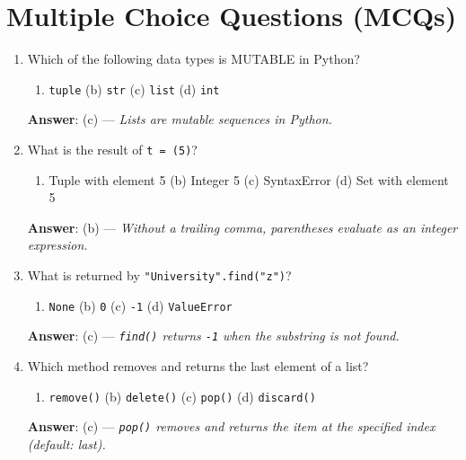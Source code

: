 \section{Multiple Choice Questions (MCQs)}

\begin{enumerate}[leftmargin=1.5em]
    \item Which of the following data types is MUTABLE in Python?
    \begin{enumerate}[label=(\alph*)]
        \item \texttt{tuple} \quad (b) \texttt{str} \quad (c) \texttt{list} \quad (d) \texttt{int}
    \end{enumerate}
    \textbf{Answer}: (c) --- \textit{Lists are mutable sequences in Python.}

    \item What is the result of \texttt{t = (5)}?
    \begin{enumerate}[label=(\alph*)]
        \item Tuple with element 5 \quad (b) Integer 5 \quad (c) SyntaxError \quad (d) Set with element 5
    \end{enumerate}
    \textbf{Answer}: (b) --- \textit{Without a trailing comma, parentheses evaluate as an integer expression.}

    \item What is returned by \texttt{"University".find("z")}?
    \begin{enumerate}[label=(\alph*)]
        \item \texttt{None} \quad (b) \texttt{0} \quad (c) \texttt{-1} \quad (d) \texttt{ValueError}
    \end{enumerate}
    \textbf{Answer}: (c) --- \textit{\texttt{find()} returns \texttt{-1} when the substring is not found.}

    \item Which method removes and returns the last element of a list?
    \begin{enumerate}[label=(\alph*)]
        \item \texttt{remove()} \quad (b) \texttt{delete()} \quad (c) \texttt{pop()} \quad (d) \texttt{discard()}
    \end{enumerate}
    \textbf{Answer}: (c) --- \textit{\texttt{pop()} removes and returns the item at the specified index (default: last).}


\end{enumerate}
